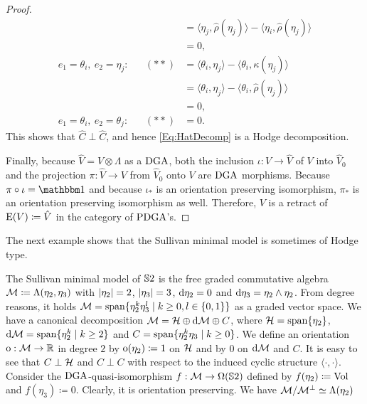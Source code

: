 \documentclass[\MainFolder/Text.tex]{subfiles}
\begin{document}
\begin{proof}
\begin{align*}
&& &= \langle \eta_j, \hat{\rho}(\eta_j) \rangle - \langle \eta_i, \hat{\rho}(\eta_j) \rangle \\
&& &= 0, \\
e_1 = \theta_i,\ e_2 = \eta_j: && (**) &= \langle \theta_i, \eta_j\rangle - \langle \theta_i, \kappa(\eta_j) \rangle \\
&& &= \langle \theta_i, \eta_j\rangle - \langle \theta_i, \hat{\rho}(\eta_j) \rangle \\
&& &= 0, \\
e_1 = \theta_i,\ e_2 = \theta_j: && (**) &= 0.
\end{align*}
This shows that $\hat{C}\perp\hat{C}$, and hence \eqref{Eq:HatDecomp} is a Hodge decomposition.

Finally, because $\hat{V} = V \otimes \Lambda$ as a $\mathrm{DGA}$, both the inclusion $\iota: V \rightarrow \hat{V}$ of $V$ into $\hat{V}_0$ and the projection $\pi: \hat{V} \rightarrow V$ from $\hat{V}_0$ onto $V$ are $\mathrm{DGA}$ morphisms.
Because $\pi \circ \iota = \Id$ and because $\iota_*$ is an orientation preserving isomorphism, $\pi_*$ is an orientation preserving isomorphism as well.
Therefore, $V$ is a retract of $\mathrm{E}(V)\coloneqq\hat{V}$ in the category of $\mathrm{PDGA}$'s.
\end{proof}

The next example shows that the Sullivan minimal model is sometimes of Hodge type.

\begin{Example}\label{Ex:SphereModel}
The Sullivan minimal model of $\mathbb{S}{2}$ is the free graded commutative algebra $\mathcal{M}\coloneqq\Lambda(\eta_2,\eta_3)$ with $|\eta_2|=2$, $|\eta_3|=3$, $\mathrm{d} \eta_2 = 0$ and $\mathrm{d}\eta_3=\eta_2\wedge\eta_2$.
From degree reasons, it holds $\mathcal{M} = \mathrm{span}\{\eta_2^k \eta_3^l \mid k\ge 0, l \in \{0,1\}\}$ as a graded vector space.
We have a canonical decomposition $\mathcal{M} = \mathcal{H} \oplus \mathrm{d} \mathcal{M} \oplus C$, where $\mathcal{H} = \mathrm{span}\{\eta_2\}$, $\mathrm{d} \mathcal{M} = \mathrm{span}\{\eta_2^k \mid k \ge 2 \}$ and $C = \mathrm{span}\{\eta_2^{k}\eta_3 \mid k \ge 0\}$.
We define an orientation $\mathrm{o} : \mathcal{M} \rightarrow \mathbb{R}$ in degree $2$ by $\mathrm{o}(\eta_2) \coloneqq 1$ on $\mathcal{H}$ and by $0$ on $\mathrm{d} \mathcal{M}$ and $C$.
It is easy to see that $C\perp \mathcal{H}$ and $C\perp C$ with respect to the induced cyclic structure $\langle \cdot,\cdot\rangle$. 
Consider the $\mathrm{DGA}$-quasi-isomorphism $f: \mathcal{M} \rightarrow \Omega(\mathbb{S}{2})$ defined by $f(\eta_2)\coloneqq \mathrm{Vol}$ and $f(\eta_3)\coloneqq 0$.
Clearly, it is orientation preserving.
We have $\mathcal{M}/\mathcal{M}^\perp\simeq \Lambda(\eta_2)$
\end{Example}
\end{document}
